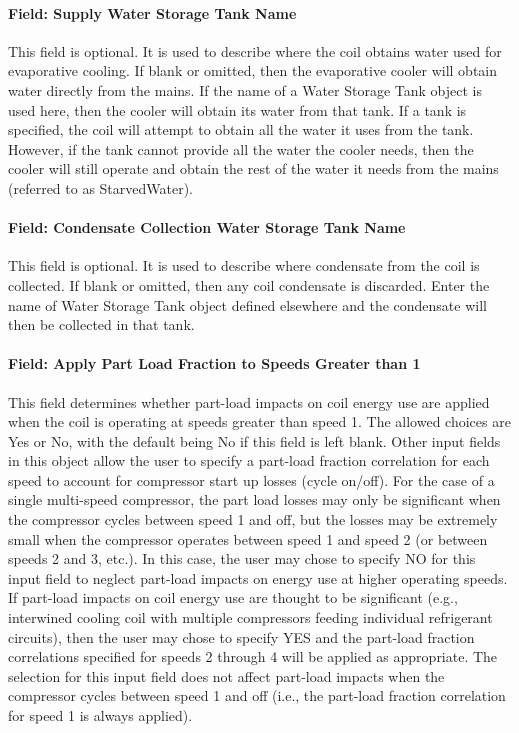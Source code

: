 \paragraph{Field: Supply Water Storage Tank Name}\label{field-supply-water-storage-tank-name-3-000}

This field is optional. It is used to describe where the coil obtains water used for evaporative cooling. If blank or omitted, then the evaporative cooler will obtain water directly from the mains. If the name of a Water Storage Tank object is used here, then the cooler will obtain its water from that tank. If a tank is specified, the coil will attempt to obtain all the water it uses from the tank. However, if the tank cannot provide all the water the cooler needs, then the cooler will still operate and obtain the rest of the water it needs from the mains (referred to as StarvedWater).

\paragraph{Field: Condensate Collection Water Storage Tank Name}\label{field-condensate-collection-water-storage-tank-name-5}

This field is optional. It is used to describe where condensate from the coil is collected. If blank or omitted, then any coil condensate is discarded. Enter the name of Water Storage Tank object defined elsewhere and the condensate will then be collected in that tank.

\paragraph{Field: Apply Part Load Fraction to Speeds Greater than 1}\label{field-apply-part-load-fraction-to-speeds-greater-than-1}

This field determines whether part-load impacts on coil energy use are applied when the coil is operating at speeds greater than speed 1. The allowed choices are Yes or No, with the default being No if this field is left blank. Other input fields in this object allow the user to specify a part-load fraction correlation for each speed to account for compressor start up losses (cycle on/off). For the case of a single multi-speed compressor, the part load losses may only be significant when the compressor cycles between speed 1 and off, but the losses may be extremely small when the compressor operates between speed 1 and speed 2 (or between speeds 2 and 3, etc.). In this case, the user may chose to specify NO for this input field to neglect part-load impacts on energy use at higher operating speeds. If part-load impacts on coil energy use are thought to be significant (e.g., interwined cooling coil with multiple compressors feeding individual refrigerant circuits), then the user may chose to specify YES and the part-load fraction correlations specified for speeds 2 through 4 will be applied as appropriate. The selection for this input field does not affect part-load impacts when the compressor cycles between speed 1 and off (i.e., the part-load fraction correlation for speed 1 is always applied).

